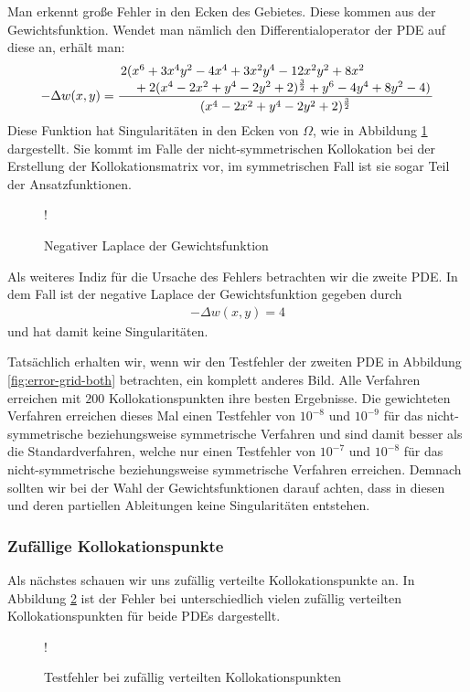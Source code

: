 Man erkennt große Fehler in den Ecken des Gebietes. Diese kommen aus der Gewichtsfunktion. Wendet man nämlich den Differentialoperator der \ac{PDE} auf diese an, erhält man:
\begin{align*}
-\Delta w(x,y) = \frac{\splitfrac{ 2(x^6+3x^4y^2-4x^4+3x^2y^4-12x^2y^2+8x^2}{+2(x^4-2x^2+y^4-2y^2+2)^{\frac{3}{2}}+y^6-4y^4+8y^2-4)}}{(x^4-2x^2+y^4-2y^2+2)^{\frac{3}{2}}}
\end{align*}
Diese Funktion hat Singularitäten in den Ecken von $\Omega$, wie in Abbildung \ref{fig:Gewicht} dargestellt. Sie kommt im Falle der nicht-symmetrischen Kollokation bei der Erstellung der Kollokationsmatrix vor, im symmetrischen Fall ist sie sogar Teil der Ansatzfunktionen.
\begin{figure}[ht]
\centering
\resizebox {\columnwidth} {!} {

}
\caption{Negativer Laplace der Gewichtsfunktion}
\label{fig:Gewicht}
\end{figure}
Als weiteres Indiz für die Ursache des Fehlers betrachten wir die zweite \ac{PDE}. In dem Fall ist der negative Laplace der Gewichtsfunktion gegeben durch
\begin{align*}
- \Delta w(x,y) = 4
\end{align*}
und hat damit keine Singularitäten.

Tatsächlich erhalten wir, wenn wir den Testfehler der zweiten \ac{PDE} in Abbildung \ref{fig:error-grid-both} betrachten, ein komplett anderes Bild. Alle Verfahren erreichen mit $200$ Kollokationspunkten ihre besten Ergebnisse. Die gewichteten Verfahren erreichen dieses Mal einen Testfehler von $10^{-8}$ und $10^{-9}$ für das nicht-symmetrische beziehungsweise symmetrische Verfahren und sind damit besser als die Standardverfahren, welche nur einen Testfehler von $10^{-7}$ und $10^{-8}$ für das nicht-symmetrische beziehungsweise symmetrische Verfahren erreichen. Demnach sollten wir bei der Wahl der Gewichtsfunktionen darauf achten, dass in diesen und deren partiellen Ableitungen keine Singularitäten entstehen.

\subsubsection{Zufällige Kollokationspunkte}
Als nächstes schauen wir uns zufällig verteilte Kollokationspunkte an. In Abbildung \ref{fig:error-random} ist der Fehler bei unterschiedlich vielen zufällig verteilten Kollokationspunkten für beide \acp{PDE} dargestellt.
\begin{figure}[ht]
\centering
\resizebox {\columnwidth} {!} {

}
\caption{Testfehler bei zufällig verteilten Kollokationspunkten}
\label{fig:error-random}
\end{figure}

